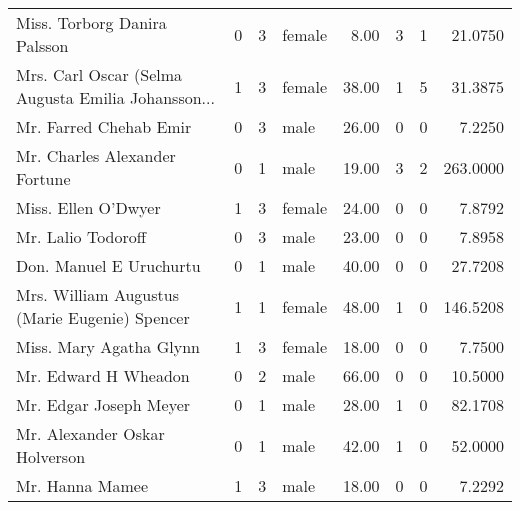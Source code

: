 \begin{tabular}{lrrlrrrr}
Miss. Torborg Danira Palsson                       &         0 &       3 &  female &   8.00 &                        3 &                        1 &   21.0750 \\
Mrs. Carl Oscar (Selma Augusta Emilia Johansson... &         1 &       3 &  female &  38.00 &                        1 &                        5 &   31.3875 \\
Mr. Farred Chehab Emir                             &         0 &       3 &    male &  26.00 &                        0 &                        0 &    7.2250 \\
Mr. Charles Alexander Fortune                      &         0 &       1 &    male &  19.00 &                        3 &                        2 &  263.0000 \\
Miss. Ellen O'Dwyer                                &         1 &       3 &  female &  24.00 &                        0 &                        0 &    7.8792 \\
Mr. Lalio Todoroff                                 &         0 &       3 &    male &  23.00 &                        0 &                        0 &    7.8958 \\
Don. Manuel E Uruchurtu                            &         0 &       1 &    male &  40.00 &                        0 &                        0 &   27.7208 \\
Mrs. William Augustus (Marie Eugenie) Spencer      &         1 &       1 &  female &  48.00 &                        1 &                        0 &  146.5208 \\
Miss. Mary Agatha Glynn                            &         1 &       3 &  female &  18.00 &                        0 &                        0 &    7.7500 \\
Mr. Edward H Wheadon                               &         0 &       2 &    male &  66.00 &                        0 &                        0 &   10.5000 \\
Mr. Edgar Joseph Meyer                             &         0 &       1 &    male &  28.00 &                        1 &                        0 &   82.1708 \\
Mr. Alexander Oskar Holverson                      &         0 &       1 &    male &  42.00 &                        1 &                        0 &   52.0000 \\
Mr. Hanna Mamee                                    &         1 &       3 &    male &  18.00 &                        0 &                        0 &    7.2292 \\

\end{tabular}
